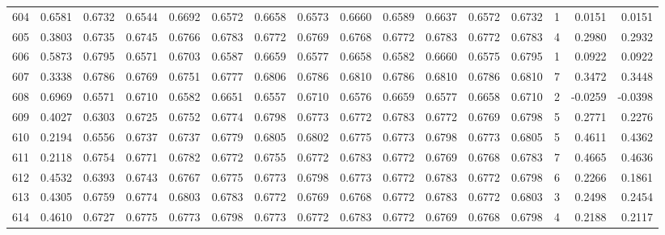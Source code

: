 \begin{tabular}{lrrrrrrrrrrrrrrr}
604 &      0.6581 &  0.6732 &  0.6544 &  0.6692 &  0.6572 &  0.6658 &  0.6573 &  0.6660 &  0.6589 &  0.6637 &   0.6572 &     0.6732 &      1 &                    0.0151 &                     0.0151 \\
605 &      0.3803 &  0.6735 &  0.6745 &  0.6766 &  0.6783 &  0.6772 &  0.6769 &  0.6768 &  0.6772 &  0.6783 &   0.6772 &     0.6783 &      4 &                    0.2980 &                     0.2932 \\
606 &      0.5873 &  0.6795 &  0.6571 &  0.6703 &  0.6587 &  0.6659 &  0.6577 &  0.6658 &  0.6582 &  0.6660 &   0.6575 &     0.6795 &      1 &                    0.0922 &                     0.0922 \\
607 &      0.3338 &  0.6786 &  0.6769 &  0.6751 &  0.6777 &  0.6806 &  0.6786 &  0.6810 &  0.6786 &  0.6810 &   0.6786 &     0.6810 &      7 &                    0.3472 &                     0.3448 \\
608 &      0.6969 &  0.6571 &  0.6710 &  0.6582 &  0.6651 &  0.6557 &  0.6710 &  0.6576 &  0.6659 &  0.6577 &   0.6658 &     0.6710 &      2 &                   -0.0259 &                    -0.0398 \\
609 &      0.4027 &  0.6303 &  0.6725 &  0.6752 &  0.6774 &  0.6798 &  0.6773 &  0.6772 &  0.6783 &  0.6772 &   0.6769 &     0.6798 &      5 &                    0.2771 &                     0.2276 \\
610 &      0.2194 &  0.6556 &  0.6737 &  0.6737 &  0.6779 &  0.6805 &  0.6802 &  0.6775 &  0.6773 &  0.6798 &   0.6773 &     0.6805 &      5 &                    0.4611 &                     0.4362 \\
611 &      0.2118 &  0.6754 &  0.6771 &  0.6782 &  0.6772 &  0.6755 &  0.6772 &  0.6783 &  0.6772 &  0.6769 &   0.6768 &     0.6783 &      7 &                    0.4665 &                     0.4636 \\
612 &      0.4532 &  0.6393 &  0.6743 &  0.6767 &  0.6775 &  0.6773 &  0.6798 &  0.6773 &  0.6772 &  0.6783 &   0.6772 &     0.6798 &      6 &                    0.2266 &                     0.1861 \\
613 &      0.4305 &  0.6759 &  0.6774 &  0.6803 &  0.6783 &  0.6772 &  0.6769 &  0.6768 &  0.6772 &  0.6783 &   0.6772 &     0.6803 &      3 &                    0.2498 &                     0.2454 \\
614 &      0.4610 &  0.6727 &  0.6775 &  0.6773 &  0.6798 &  0.6773 &  0.6772 &  0.6783 &  0.6772 &  0.6769 &   0.6768 &     0.6798 &      4 &                    0.2188 &                     0.2117 \\

\end{tabular}
